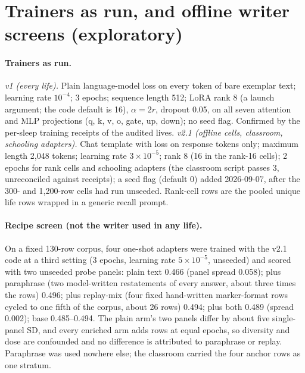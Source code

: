 \documentclass{article}
\begin{document}
\section{Trainers as run, and offline writer screens (exploratory)}
\label{app:writer}

\paragraph{Trainers as run.} \emph{v1 (every life).} Plain language-model loss on every token of bare exemplar text; learning rate $10^{-4}$; 3 epochs; sequence length 512; LoRA rank 8 (a launch argument; the code default is 16), $\alpha = 2r$, dropout 0.05, on all seven attention and MLP projections (q, k, v, o, gate, up, down); no seed flag. Confirmed by the per-sleep training receipts of the audited lives. \emph{v2.1 (offline cells, classroom, schooling adapters).} Chat template with loss on response tokens only; maximum length 2{,}048 tokens; learning rate $3\times10^{-5}$; rank 8 (16 in the rank-16 cells); 2 epochs for rank cells and schooling adapters (the classroom script passes 3, unreconciled against receipts); a seed flag (default 0) added 2026-09-07, after the 300- and 1{,}200-row cells had run unseeded. Rank-cell rows are the pooled unique life rows wrapped in a generic recall prompt.

\paragraph{Recipe screen (not the writer used in any life).} On a fixed 130-row corpus, four one-shot adapters were trained with the v2.1 code at a third setting (3 epochs, learning rate $5\times10^{-5}$, unseeded) and scored with two unseeded probe panels: plain text 0.466 (panel spread 0.058); plus paraphrase (two model-written restatements of every answer, about three times the rows) 0.496; plus replay-mix (four fixed hand-written marker-format rows cycled to one fifth of the corpus, about 26 rows) 0.494; plus both 0.489 (spread 0.002); base 0.485--0.494. The plain arm's two panels differ by about five single-panel SD, and every enriched arm adds rows at equal epochs, so diversity and dose are confounded and no difference is attributed to paraphrase or replay. Paraphrase was used nowhere else; the classroom carried the four anchor rows as one stratum.
\end{document}
